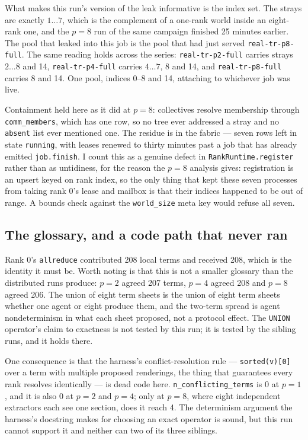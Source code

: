 \documentclass[11pt]{article}
\begin{document}
What makes this run's version of the leak informative is the index set. The strays are exactly
$1\ldots7$, which is the complement of a one-rank world inside an eight-rank one, and the $p=8$
run of the same campaign finished 25 minutes earlier. The pool that leaked into this job is the
pool that had just served \texttt{real-tr-p8-full}. The same reading holds across the series:
\texttt{real-tr-p2-full} carries strays $2\ldots8$ and 14, \texttt{real-tr-p4-full} carries
$4\ldots7$, 8 and 14, and \texttt{real-tr-p8-full} carries 8 and 14. One pool, indices 0--8 and
14, attaching to whichever job was live.

Containment held here as it did at $p=8$: collectives resolve membership through
\texttt{comm\_members}, which has one row, so no tree ever addressed a stray and no \texttt{absent}
list ever mentioned one. The residue is in the fabric --- seven rows left in state
\texttt{running}, with leases renewed to thirty minutes past a job that has already emitted
\texttt{job.finish}. I count this as a genuine defect in \texttt{RankRuntime.register} rather than
as untidiness, for the reason the $p=8$ analysis gives: registration is an upsert keyed on rank
index, so the only thing that kept these seven processes from taking rank 0's lease and mailbox is
that their indices happened to be out of range. A bounds check against the \texttt{world\_size}
meta key would refuse all seven.

\subsection*{The glossary, and a code path that never ran}

Rank 0's \texttt{allreduce} contributed 208 local terms and received 208, which is the identity
it must be. Worth noting is that this is not a smaller glossary than the distributed runs
produce: $p=2$ agreed 207 terms, $p=4$ agreed 208 and $p=8$ agreed 206. The union of eight term
sheets is the union of eight term sheets whether one agent or eight produce them, and the two-term
spread is agent nondeterminism in what each sheet proposed, not a protocol effect. The
\texttt{UNION} operator's claim to exactness is not tested by this run; it is tested by the
sibling runs, and it holds there.

One consequence is that the harness's conflict-resolution rule --- \texttt{sorted(v)[0]} over a
term with multiple proposed renderings, the thing that guarantees every rank resolves identically
--- is dead code here. \texttt{n\_conflicting\_terms} is 0 at $p=1$, and it is also 0 at $p=2$ and
$p=4$; only at $p=8$, where eight independent extractors each see one section, does it reach 4.
The determinism argument the harness's docstring makes for choosing an exact operator is sound,
but this run cannot support it and neither can two of its three siblings.
\end{document}

